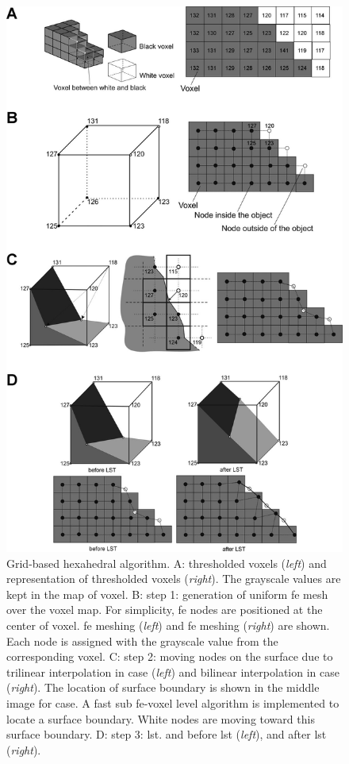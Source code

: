 \renewcommand{\imsize}{0.618\linewidth}
\begin{figure}[p]
	\centering
	\includegraphics[width=\imsize]{img/Tsuda2008/Tsuda-04}
	\caption[Grid-based hexahedral algorithm]{Grid-based hexahedral algorithm. A: \threed thresholded voxels (\textit{left}) and \twod representation of thresholded voxels (\textit{right}). The grayscale values are kept in the map of voxel. B: step 1: generation of uniform \acl{fe} mesh over the voxel map. For simplicity, \ac{fe} nodes are positioned at the center of voxel. \threed \ac{fe} meshing (\textit{left}) and \twod \ac{fe} meshing (\textit{right}) are shown. Each node is assigned with the grayscale value from the corresponding voxel. C: step 2: moving nodes on the surface due to trilinear interpolation in \threed case (\textit{left}) and bilinear interpolation in \twod case (\textit{right}). The location of surface boundary is shown in the middle image for \twod case. A fast sub \ac{fe}-voxel level algorithm is implemented to locate a surface boundary. White nodes are moving toward this surface boundary. D: step 3: \acf{lst}. \threed and \twod before \ac{lst} (\textit{left}), \threed and \twod after \ac{lst} (\textit{right}).}
	\label{fig:hexahedral}
\end{figure}

